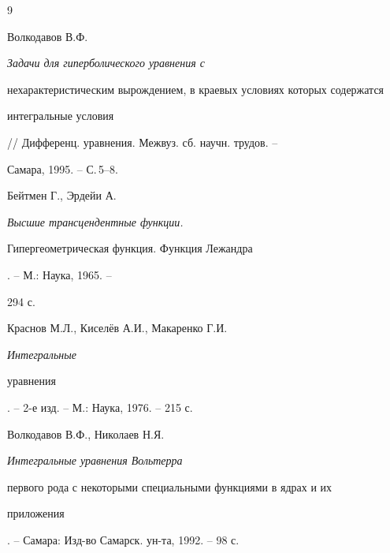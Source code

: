 \begin{thebibliography}{9} 


 




Волкодавов В.Ф. {\em Задачи для гиперболического уравнения с 


нехарактеристическим вырождением, в краевых условиях которых содержатся 


интегральные условия} // Дифференц. уравнения. Межвуз. сб. научн. трудов. --


Самара, 1995. -- С.\,5--8. 




Бейтмен Г., Эрдейи А. {\em Высшие трансцендентные функции. 


Гипергеометрическая функция. Функция Лежандра}. -- М.: Наука, 1965. -- 


294 с. 




Краснов М.Л., Кисел\"ев А.И., Макаренко Г.И. {\em Интегральные 


уравнения}. -- 2-е изд. -- М.: Наука, 1976. -- 215 с. 




Волкодавов В.Ф., Николаев Н.Я. {\em Интегральные уравнения Вольтерра 


первого рода с некоторыми специальными функциями в ядрах и их 


приложения}. -- Самара: Изд-во Самарск. ун-та, 1992. -- 98 с. 


 


\end{thebibliography} 


 


\vskip 2cm 


 






\smallskip 






 


\label{end} 


 


 


